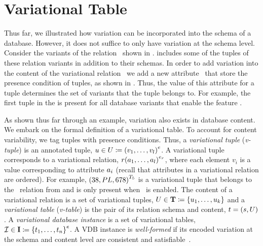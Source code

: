 \section{Variational Table}
\label{sec:vtab}


Thus far, 
we illustrated how variation can be incorporated into the schema of a database.
However, it does not suffice to only have variation at the schema level. Consider the 
variants of the relation \empbio\ shown in . 
includes some of the tuples of these relation variants in addition to their schemas. 
In order to add variation into the content of the variational relation \empbio\ we
add a new attribute \pcatt\ that store the presence condition of tuples, as shown in
. Thus,
the value of this attribute for a tuple determines the set of variants that the tuple
belongs to. For example, the first tuple in the  is present for
all database variants that enable the feature \vThree. 


As shown thus far through an example, variation also exists in database content. 
We embark on the formal definition of a variational table. 
To account 
for content variability, we tag tuples with 
presence conditions. 
%
Thus, a \emph{variational tuple} (\emph{v-tuple}) is an annotated tuple,
$\vTuple\in\vRelCont \eqq \annot[\dimMeta]{(\vi v \numAtts)}$. A
variational tuple corresponds to a variational relation,
$\vRel\annot[\dimMeta_\vRel]{(\vi \vAtt \numAtts)}$,
where each element $v_i$ is a value corresponding to attribute $\vAtt_i$
(recall that attributes in a variational relation are ordered).
%
For example, $\annot[\tFive]{(38, PL, 678)}$ is a variational tuple that belongs to the
\ecourse\ relation from  and is only present when \tFive\ is
enabled. 
%
The content of a variational relation
is a set of variational tuples,
$\vRelCont \in \vRelContSet \eqq \setDef {\vi \vTuple \numTuples}$
and 
%
a \emph{variational table} (\emph{v-table}) is the pair of its relation
schema and content, $\vTab = (\vRelSch, \vRelCont)$.
%
A \emph{variational database instance}
is a set of variational tables,
$\synDef \vdbInst  \vdbInstSet \eqq \annot [\dimMeta] {\setDef {\vi \vTab \numRels} }$.
%
A VDB instance is \emph{well-formed} if its encoded variation at
the schema and content level are consistent and satisfiable~\cite{ALW21vamos}.

